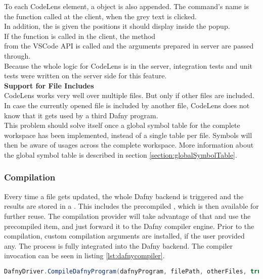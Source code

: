 To each CodeLens element, a  object is also appended.
The command's name is the function called at the client, when the grey text is clicked.\\

In addition, the  is given the positions it should display inside the popup.  \\

If the function  is called in the client,
the method \\
 from the VSCode API is called
and the arguments prepared in server are passed through. \\

Because the whole logic for CodeLens is in the server,
integration tests and unit tests were written on the server side for this feature.\\

\textbf{Support for File Includes} \\
CodeLens works very well over multiple files.
But only if other files are included.
In case the currently opened file is included by another file,
CodeLens does not know that it gets used by a third Dafny program. \\

This problem should solve itself once a global symbol table for the complete workspace has been implemented,
instead of a single table per file.
Symbols will then be aware of usages across the complete workspace.
More information about the global symbol table is described in section \ref{section:globalSymbolTable}.

\subsubsection{Compilation}
Every time a file gets updated, the whole Dafny backend is triggered and the results are stored in a .
This includes the precompiled , which is then available for further reuse.
The compilation provider will take advantage of that and use the precompiled item, and just forward it to the Dafny compiler engine.
Prior to the compilation, custom compilation arguments are installed, if the user provided any.
The process is fully integrated into the Dafny backend.
The compiler invocation can be seen in listing \ref{lst:dafnycompiler}.\\

\begin{lstlisting}[language=csharp, caption={Calling the Dafny Compiler}, captionpos=b, label={lst:dafnycompiler}]
DafnyDriver.CompileDafnyProgram(dafnyProgram, filePath, otherFiles, true, textWriter);
\end{lstlisting}

